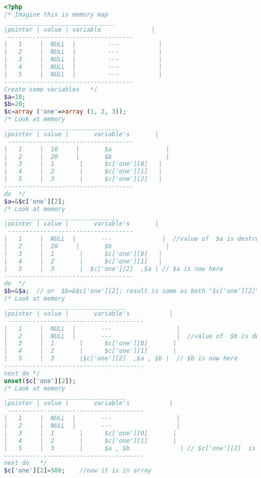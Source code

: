 \begin{lstlisting}[language=PHP]
<?php
/* Imagine this is memory map
 ______________________________
|pointer | value | variable              |
 -----------------------------------
|   1     |  NULL  |         ---           |
|   2     |  NULL  |         ---           |
|   3     |  NULL  |         ---           |
|   4     |  NULL  |         ---           |
|   5     |  NULL  |         ---           |
------------------------------------
Create some variables   */
$a=10;
$b=20;
$c=array ('one'=>array (1, 2, 3));
/* Look at memory
 _______________________________
|pointer | value |       variable's       |
 -----------------------------------
|   1     |  10     |       $a               |
|   2     |  20     |       $b               |
|   3     |  1       |      $c['one'][0]   |
|   4     |  2       |      $c['one'][1]   |
|   5     |  3       |      $c['one'][2]   |
------------------------------------
do  */
$a=&$c['one'][2];
/* Look at memory
 _______________________________
|pointer | value |       variable's       |
 -----------------------------------
|   1     |  NULL  |       ---              |  //value of  $a is destroyed and pointer is free
|   2     |  20     |       $b               |
|   3     |  1       |      $c['one'][0]   |
|   4     |  2       |      $c['one'][1]   |
|   5     |  3       |  $c['one'][2]  ,$a | // $a is now here
------------------------------------
do  */
$b=&$a;  // or  $b=&$c['one'][2]; result is same as both "$c['one'][2]" and "$a" is at same pointer.
/* Look at memory
 _________________________________
|pointer | value |       variable's           |
 --------------------------------------
|   1     |  NULL  |       ---                  |  
|   2     |  NULL  |       ---                  |  //value of  $b is destroyed and pointer is free
|   3     |  1       |      $c['one'][0]       |
|   4     |  2       |      $c['one'][1]       |
|   5     |  3       |$c['one'][2]  ,$a , $b |  // $b is now here
---------------------------------------
next do */
unset($c['one'][2]);
/* Look at memory
 _________________________________
|pointer | value |       variable's           |
 --------------------------------------
|   1     |  NULL  |       ---                  |  
|   2     |  NULL  |       ---                  |  
|   3     |  1       |      $c['one'][0]       |
|   4     |  2       |      $c['one'][1]       |
|   5     |  3       |      $a , $b              | // $c['one'][2]  is  destroyed not in memory, not in array
---------------------------------------
next do   */
$c['one'][2]=500;    //now it is in array

\end{lstlisting}
